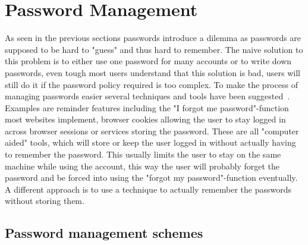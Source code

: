 \section{Password Management}
As seen in the previous sections passwords introduce a dilemma as passwords are supposed to be hard to "guess" and thus hard to remember. The naive solution to this problem is to either use one password for many accounts or to write down passwords, even tough most users understand that this solution is bad, users will still do it if the password policy required is too complex. To make the process of managing passwords easier several techniques and tools have been suggested~\cite{management-strategies}. Examples are reminder features including the "I forgot me password"-function most websites implement, browser cookies allowing the user to stay logged in across browser sessions or services storing the password. These are all "computer aided" tools, which will store or keep the user logged in without actually having to remember the password. This usually limits the user to stay on the same machine while using the account, this way the user will probably forget the password and be forced into using the "forgot my password"-function eventually. A different approach is to use a technique to actually remember the passwords without storing them.


\subsection{Password management schemes}
 
